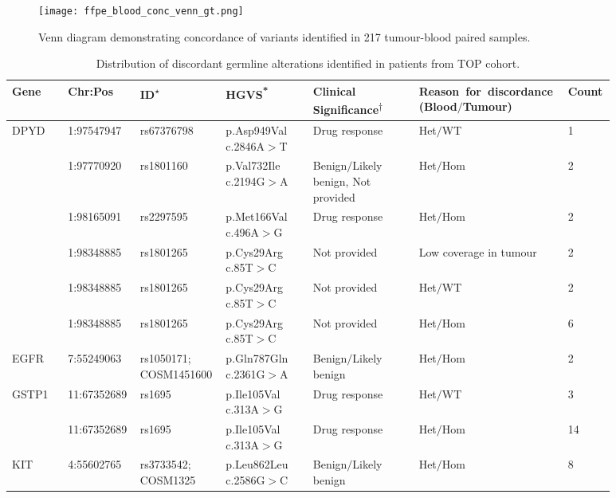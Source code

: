 \begin{figure}[H]
\centering
	\texttt{[image: ffpe\_blood\_conc\_venn\_gt.png]}
	\caption{Venn diagram demonstrating concordance of variants identified in 217 tumour-blood paired samples.}
	\label{fig:ffpe_blood_conc_venn}
\end{figure}


\newpage
\begin{landscape}

\begin{longtable}{p{0.09\linewidth}|p{0.1\linewidth}p{0.12\linewidth}p{0.14\linewidth}p{0.17\linewidth}p{0.2\linewidth}p{0.06\linewidth}}
\caption{Distribution of discordant germline alterations identified in patients from TOP cohort.}
\label{tbl:freq_discordant_germline}
		\\
		\hline
		Gene & Chr:Pos & ID\textsuperscript{$\star$} & HGVS\textsuperscript{*} & Clinical Significance\textsuperscript{$\dagger$} & \hbox{Reason for discordance} (Blood$/$Tumour) & Count
		\\
		\hline
		DPYD & 1:97547947 & rs67376798 & p.Asp949Val c.2846A$>$T & Drug response & Het$/$WT & 1
		\\
		& 1:97770920 & rs1801160 & p.Val732Ile c.2194G$>$A & Benign$/$Likely benign, Not provided & Het$/$Hom & 2
		\\
		& 1:98165091 & rs2297595 & p.Met166Val c.496A$>$G & Drug response &  Het$/$Hom & 2
		\\
		& 1:98348885 & rs1801265 & p.Cys29Arg c.85T$>$C & Not provided & Low coverage in tumour & 2
		\\
		& 1:98348885 & rs1801265 & p.Cys29Arg c.85T$>$C & Not provided & Het$/$WT & 2
		\\
		& 1:98348885 & rs1801265 & p.Cys29Arg c.85T$>$C & Not provided & Het$/$Hom & 6
		\\
		\hline
		EGFR & 7:55249063 & rs1050171; COSM1451600 & p.Gln787Gln c.2361G$>$A & Benign$/$Likely benign & Het$/$Hom & 2
		\\
		\hline
		GSTP1 & 11:67352689 & rs1695 & p.Ile105Val c.313A$>$G & Drug response & Het$/$WT & 3
		\\
		& 11:67352689 & rs1695 & p.Ile105Val c.313A$>$G & Drug response & Het$/$Hom & 14
		\\
		\hline
		KIT & 4:55602765 & rs3733542; COSM1325 & p.Leu862Leu c.2586G$>$C & Benign$/$Likely benign & Het$/$Hom & 8

\end{longtable}
\end{landscape}
